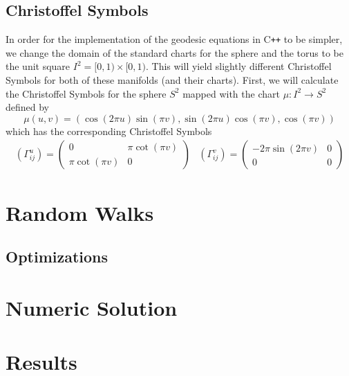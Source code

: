 \documentclass{article}
\begin{document}
	\subsection{Christoffel Symbols}
		In order for the implementation of the geodesic equations in C\texttt{++} to be simpler, we change the domain of the standard charts for the sphere and the torus to be the unit square $I^2 = [0,1) \times [0,1)$.
		This will yield slightly different Christoffel Symbols for both of these manifolds (and their charts).
		First, we will calculate the Christoffel Symbols for the sphere $S^2$ mapped with the chart $\mu:I^2 \to S^2$ defined by
		$$ \mu(u,v) = (\cos(2\pi u)\sin(\pi v), \sin(2\pi u)\cos(\pi v), \cos(\pi v)) $$
		which has the corresponding Christoffel Symbols
		\begin{equation}
			\begin{array}{lr}
			\left(\Gamma^{u}_{ij}\right) = \left( \begin{array}{cc}
					0 & \pi\cot(\pi v) \\
					\pi\cot(\pi v) & 0
				\end{array} \right) &
			\left(\Gamma^{v}_{ij}\right) = \left( \begin{array}{cc}
					-2\pi\sin(2\pi v) & 0 \\
					0 & 0
				\end{array} \right)
			\end{array}
		\end{equation}
	
\section{Random Walks}
	
	\subsection{Optimizations}

\section{Numeric Solution}

\section{Results}



\end{document}

